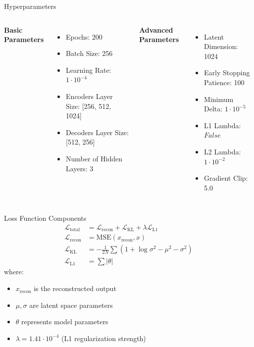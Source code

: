 \documentclass{beamer}
\begin{document}
\begin{frame}{Hyperparameters}
    \begin{columns}
        \textbf{Basic Parameters}
        \begin{itemize}
            \item Epochs: 200
            \item Batch Size: 256
            \item Learning Rate: $1 \cdot 10^{-4}$
            \item Encoders Layer Size: [256, 512, 1024]
            \item Decoders Layer Size: [512, 256]
            \item Number of Hidden Layers: 3
        \end{itemize}
        
        \textbf{Advanced Parameters}
        \begin{itemize}
            \item Latent Dimension: 1024
            \item Early Stopping Patience: 100
            \item Minimum Delta: $1 \cdot 10^{-5}$
            \item L1 Lambda: $False$
            \item L2 Lambda: $1 \cdot 10^{-2}$
            \item Gradient Clip: 5.0
        \end{itemize}
    \end{columns}
\end{frame}

\begin{frame}{Loss Function Components}
    \begin{align*}
        \mathcal{L}_{\text{total}} &= \mathcal{L}_{\text{recon}} + \mathcal{L}_{\text{KL}} + \lambda\mathcal{L}_{\text{L1}} \\[1em]
        \mathcal{L}_{\text{recon}} &= \text{MSE}(x_{\text{recon}}, x) \\[0.5em]
        \mathcal{L}_{\text{KL}} &= -\frac{1}{2N}\sum(1 + \log\sigma^2 - \mu^2 - \sigma^2) \\[0.5em]
        \mathcal{L}_{\text{L1}} &= \sum|\theta|
    \end{align*}
    where:
    \begin{itemize}
        \item $x_{\text{recon}}$ is the reconstructed output
        \item $\mu, \sigma$ are latent space parameters
        \item $\theta$ represents model parameters
        \item $\lambda = 1.41 \cdot 10^{-4}$ (L1 regularization strength)
    \end{itemize}
\end{frame}
\end{document}
